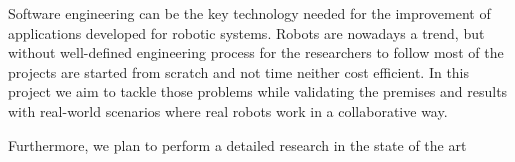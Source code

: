 Software engineering can be the key technology needed for the improvement of applications developed for robotic systems.
Robots are nowadays a trend, but without well-defined engineering process for the researchers to follow most of the projects are started from scratch and not time neither cost efficient.
In this project we aim to tackle those problems while validating the premises and results with real-world scenarios where real robots work in a collaborative way.

Furthermore, we plan to perform a detailed research in the state of the art
